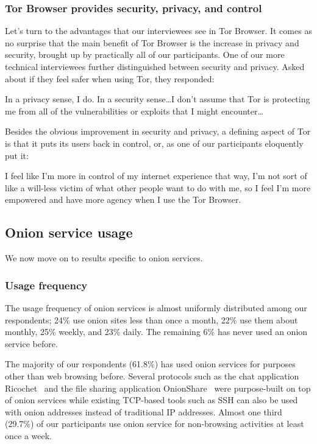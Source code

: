 \subsubsection{Tor Browser provides security, privacy, and control}

Let's turn to the advantages that our interviewees see in Tor Browser.  It comes
as no surprise that the main benefit of Tor Browser is the increase in privacy
and security, brought up by practically all of our participants.  One of our
more technical interviewees further distinguished between security and privacy.
Asked about if they feel safer when using Tor, they responded:

\begin{displayquote}
In a privacy sense, I do. In a security sense\ldots I don't assume that Tor is
protecting me from all of the vulnerabilities or exploits that I might
encounter\ldots
\end{displayquote}

Besides the obvious improvement in security and privacy, a defining aspect of
Tor is that it puts its users back in control, or, as one of our participants
eloquently put it:

\begin{displayquote}
I feel like I'm more in control of my internet experience that way, I'm not sort
of like a will-less victim of what other people want to do with me, so I feel
I'm more empowered and have more agency when I use the Tor Browser.
\end{displayquote}

\subsection{Onion service usage}

We now move on to results specific to onion services.

\subsubsection{Usage frequency}

The usage frequency of onion services is almost uniformly distributed among our
respondents; 24\% use onion sites less than once a month, 22\% use them about
monthly, 25\% weekly, and 23\% daily.  The remaining 6\% has never used an onion
service before.

The majority of our respondents (61.8\%) has used onion services for purposes
other than web browsing before.  Several protocols such as the chat application
Ricochet~\cite{ricochet} and the file sharing application
OnionShare~\cite{onionshare} were purpose-built on top of onion services while
existing TCP-based tools such as SSH can also be used with onion addresses
instead of traditional IP addresses.  Almost one third (29.7\%) of our
participants use onion service for non-browsing activities at least once a week.

